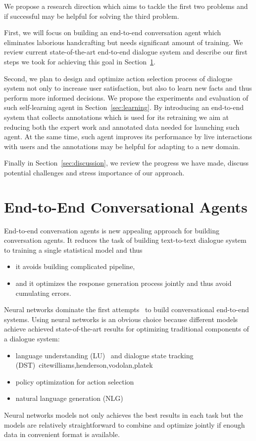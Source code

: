 \documentclass[11pt]{article}
\begin{document}
We propose a research direction which aims to tackle the first two problems and if successful may be helpful for solving the third problem.

First, we will focus on building an end-to-end conversation agent which eliminates laborious handcrafting but needs significant amount of training. 
We review current state-of-the-art end-to-end dialogue system and describe our first steps we took for achieving this goal in Section~\ref{sec:e2end}.

Second, we plan to design and optimize action selection process of dialogue system not only to increase user satisfaction, but also to learn new facts and thus perform more informed decisions.
We propose the experiments and evaluation of such self-learning agent in Section~\ref{sec:learning}.
By introducing an end-to-end system that collects annotations which is used for its retraining we aim at reducing both the expert work and annotated data needed for launching such agent.
At the same time, such agent improves its performance by live interactions with users and the annotations may be helpful for adapting to a new domain.

Finally in Section~\ref{sec:discussion}, we review the progress we have made, discuss potential challenges and stress importance of our approach.

\section{End-to-End Conversational Agents}
\label{sec:e2end}
End-to-end conversation agents is new appealing approach for building conversation agents.
It reduces the task of building text-to-text dialogue system to training a single statistical model and thus
\begin{itemize}
    \item it avoids building complicated pipeline,
    \item and it optimizes the response generation process jointly and thus avoid cumulating errors.
\end{itemize}

Neural networks dominate the first attempts~\citep{We,Williams,Weston,Dodge} to build conversational end-to-end systems.
Using neural networks is an obvious choice because different models achieve achieved state-of-the-art results for optimizing traditional components of a dialogue system:
\begin{itemize}
    \item language understanding (LU)~\cite{todo} and dialogue state tracking (DST)~cite{williams,henderson,vodolan,platek}
    \item policy optimization for action selection~\cite{todo}
    \item natural language generation (NLG)~\cite{dusek,wen}
\end{itemize}
Neural networks models not only achieves the best results in each task but the models are relatively straightforward to combine and optimize jointly if enough data in convenient format is available.
\end{document}
